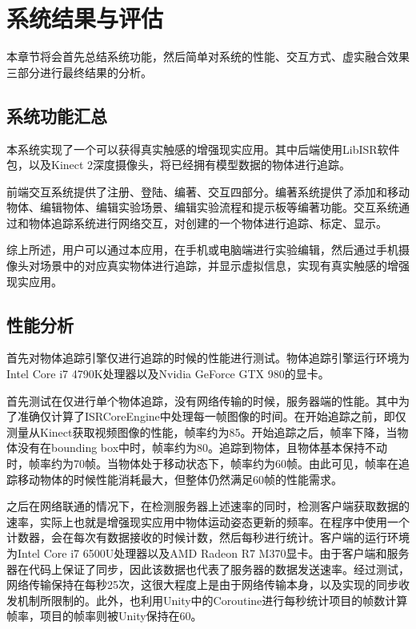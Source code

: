 \chapter{系统结果与评估}
\label{result}

本章节将会首先总结系统功能，然后简单对系统的性能、交互方式、虚实融合效果三部分进行最终结果的分析。

\section{系统功能汇总}
本系统实现了一个可以获得真实触感的增强现实应用。其中后端使用LibISR软件包，以及Kinect 2深度摄像头，将已经拥有模型数据的物体进行追踪。

前端交互系统提供了注册、登陆、编著、交互四部分。编著系统提供了添加和移动物体、编辑物体、编辑实验场景、编辑实验流程和提示板等编著功能。交互系统通过和物体追踪系统进行网络交互，对创建的一个物体进行追踪、标定、显示。

综上所述，用户可以通过本应用，在手机或电脑端进行实验编辑，然后通过手机摄像头对场景中的对应真实物体进行追踪，并显示虚拟信息，实现有真实触感的增强现实应用。

\section{性能分析}

首先对物体追踪引擎仅进行追踪的时候的性能进行测试。物体追踪引擎运行环境为Intel Core i7 4790K处理器以及Nvidia GeForce GTX 980的显卡。

首先测试在仅进行单个物体追踪，没有网络传输的时候，服务器端的性能。其中为了准确仅计算了ISRCoreEngine中处理每一帧图像的时间。在开始追踪之前，即仅测量从Kinect获取视频图像的性能，帧率约为85。开始追踪之后，帧率下降，当物体没有在bounding box中时，帧率约为80。追踪到物体，且物体基本保持不动时，帧率约为70帧。当物体处于移动状态下，帧率约为60帧。由此可见，帧率在追踪移动物体的时候性能消耗最大，但整体仍然满足60帧的性能需求。

之后在网络联通的情况下，在检测服务器上述速率的同时，检测客户端获取数据的速率，实际上也就是增强现实应用中物体运动姿态更新的频率。在程序中使用一个计数器，会在每次有数据接收的时候计数，然后每秒进行统计。客户端的运行环境为Intel Core i7 6500U处理器以及AMD Radeon R7 M370显卡。由于客户端和服务器在代码上保证了同步，因此该数据也代表了服务器的数据发送速率。经过测试，网络传输保持在每秒25次，这很大程度上是由于网络传输本身，以及实现的同步收发机制所限制的。此外，也利用Unity中的Coroutine进行每秒统计项目的帧数计算帧率，项目的帧率则被Unity保持在60。

